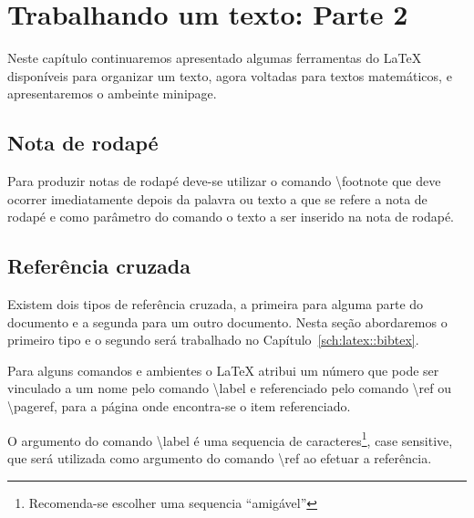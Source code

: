 % 
% 
% 
% 
% 
\chapter{Trabalhando um texto: Parte 2} \label{C:text2}
Neste capítulo continuaremos apresentado algumas ferramentas do LaTeX disponíveis para organizar um texto, agora voltadas para textos matemáticos, e apresentaremos o ambeinte \textsf{minipage}.

\section{Nota de rodapé}

Para produzir notas de rodapé deve-se utilizar o comando \textbackslash\textsf{footnote} que deve ocorrer imediatamente depois da palavra ou texto a que se refere a nota de rodapé e como parâmetro do comando o texto a ser inserido na nota de rodapé.

\section{Referência cruzada} \label{sse:cross_reference}

Existem dois tipos de referência cruzada, a primeira para alguma parte do documento e a segunda para um outro documento. Nesta seção abordaremos o primeiro tipo e o segundo será trabalhado no Capítulo~\ref{sch:latex::bibtex}.

Para alguns comandos e ambientes o LaTeX atribui um número que pode ser vinculado a um nome pelo comando \textbackslash\textsf{label} e referenciado pelo comando \textbackslash\textsf{ref} ou \textbackslash\textsf{pageref}, para a página onde encontra-se o item referenciado.

O argumento do comando \textbackslash\textsf{label} é uma sequencia de caracteres\footnote{Recomenda-se escolher uma sequencia ``amigável''}, case sensitive, que será utilizada como argumento do comando \textbackslash\textsf{ref} ao efetuar a referência.

